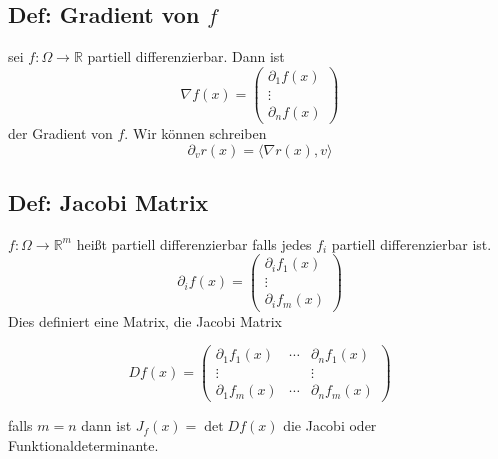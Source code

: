 \subsection{Def: Gradient von $f$}
sei $f:\Omega\rightarrow\mathbb R$ partiell differenzierbar. Dann ist
\begin{equation}
	\nabla f(x) =
	\begin{pmatrix}
		\partial_1 f(x)\\
		\vdots\\
		\partial_n f(x)
	\end{pmatrix}
\end{equation}
der Gradient von $f$. Wir können schreiben
$$
\partial_v r(x) = \langle \nabla r(x), v\rangle
$$

\subsection{Def: Jacobi Matrix}
$f:\Omega\rightarrow \mathbb R^m$ heißt partiell differenzierbar falls jedes $f_i$ partiell differenzierbar ist.
\begin{equation}
	\partial_i f(x) =
	\begin{pmatrix}
		\partial_i f_1(x)\\
		\vdots\\
		\partial_i f_m(x)
	\end{pmatrix}
\end{equation}
Dies definiert eine Matrix, die Jacobi Matrix

\begin{equation}
	Df(x) =
	\begin{pmatrix}
		\partial_1 f_1(x) & \cdots & \partial_n f_1(x)\\
		\vdots  & & \vdots\\
		\partial_1 f_m(x) & \cdots & \partial_n f_m(x)
	\end{pmatrix}
\end{equation}

falls $m=n$ dann ist $J_f(x) = \det Df(x)$ die Jacobi oder Funktionaldeterminante.








